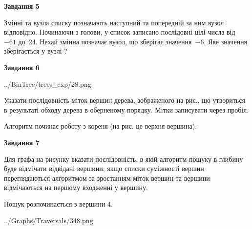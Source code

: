 \documentclass[12pt, ukrainian]{article}
\begin{document}
{\begin {large}
{\begin {center}\textbf{Завдання 5}\end {center}}\par
Змінні  та  вузла списку позначають наступний та попередній за ним вузол відповідно. Починаючи з голови, у список записано послідовні цілі числа від~$-61$ до~$24$. Нехай змінна  позначає вузол, що зберігає значення~$-6$.
Яке значення зберігається у вузлі  ?\par
\newpage

{\begin {center}\textbf{Завдання 6}\end {center}}\par

\begin{center}
	{../BinTree/trees_exp/28.png}
\end{center}
Указати послідовність міток вершин дерева, зображеного на рис., що утвориться в результаті обходу дерева в оберненому порядку. Мітки записувати через пробіл.\par Алгоритм починає роботу з кореня (на рис. це верхня вершина).\par
\newpage

{\begin {center}\textbf{Завдання 7}\end {center}}\par
Для графа на рисунку вказати послідовність, в якій алгоритм пошуку в глибину буде відмічати відвідані вершини, якщо списки суміжності вершин переглядаються алгоритмом за зростанням міток вершин та вершини відмічаються на першому вход\-женні у вершину.\par
Пошук розпочинається з вершини 4.\par

\begin{center}
	{../Graphs/Traversals/348.png}
\end{center}\par
\newpage


\end{large}}
\end{document}
